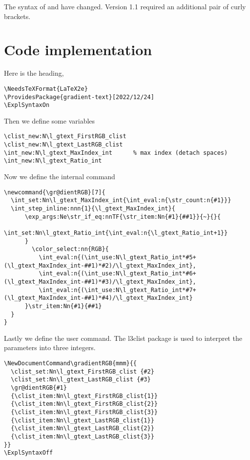 \documentclass{ltxdoc}
\begin{document}
\emph{} The syntax of  and  have changed. Version 1.1 required an additional pair of curly brackets.

\section{Code implementation}
Here is the heading,
\begin{lstlisting}[firstnumber=4]
\NeedsTeXFormat{LaTeX2e}
\ProvidesPackage{gradient-text}[2022/12/24]
\ExplSyntaxOn
\end{lstlisting}

Then we define some variables
\begin{lstlisting}[firstnumber=last]
\clist_new:N\l_gtext_FirstRGB_clist
\clist_new:N\l_gtext_LastRGB_clist
\int_new:N\l_gtext_MaxIndex_int      % max index (detach spaces)
\int_new:N\l_gtext_Ratio_int
\end{lstlisting}

Now we define the internal command 
\begin{lstlisting}[firstnumber=last,breaklines=true]
\newcommand{\gr@dientRGB}[7]{
  \int_set:Nn\l_gtext_MaxIndex_int{\int_eval:n{\str_count:n{#1}}}
  \int_step_inline:nnn{1}{\l_gtext_MaxIndex_int}{
      \exp_args:Ne\str_if_eq:nnTF{\str_item:Nn{#1}{##1}}{~}{}{
        \int_set:Nn\l_gtext_Ratio_int{\int_eval:n{\l_gtext_Ratio_int+1}}
      }
        \color_select:nn{RGB}{
          \int_eval:n{(\int_use:N\l_gtext_Ratio_int*#5+(\l_gtext_MaxIndex_int-##1)*#2)/\l_gtext_MaxIndex_int},
          \int_eval:n{(\int_use:N\l_gtext_Ratio_int*#6+(\l_gtext_MaxIndex_int-##1)*#3)/\l_gtext_MaxIndex_int},
          \int_eval:n{(\int_use:N\l_gtext_Ratio_int*#7+(\l_gtext_MaxIndex_int-##1)*#4)/\l_gtext_MaxIndex_int}
      }\str_item:Nn{#1}{##1}
  }
}
\end{lstlisting}

Lastly we define the user command. The \textsf{l3clist} package is used to interpret the parameters into three integers.
\begin{lstlisting}[firstnumber=last]
\NewDocumentCommand\gradientRGB{mmm}{{
  \clist_set:Nn\l_gtext_FirstRGB_clist {#2}
  \clist_set:Nn\l_gtext_LastRGB_clist {#3}
  \gr@dientRGB{#1}
  {\clist_item:Nn\l_gtext_FirstRGB_clist{1}}
  {\clist_item:Nn\l_gtext_FirstRGB_clist{2}}
  {\clist_item:Nn\l_gtext_FirstRGB_clist{3}}
  {\clist_item:Nn\l_gtext_LastRGB_clist{1}}
  {\clist_item:Nn\l_gtext_LastRGB_clist{2}}
  {\clist_item:Nn\l_gtext_LastRGB_clist{3}}
}}
\ExplSyntaxOff
\end{lstlisting}
\end{document}
